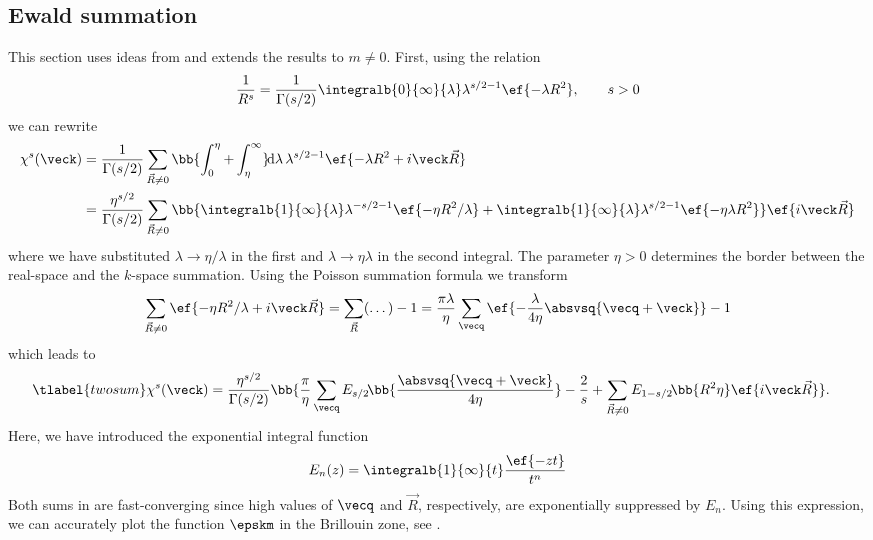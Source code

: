 \subsection{Ewald summation}
This section uses ideas from  and extends the results to $m\ne 0$.
First, using the relation
\begin{align}
    \frac{1}{R^s}=\frac{1}{\Gamma(s/2)} \integralb{0}{\infty}{\lambda} \lambda^{s/2-1} \ef{-\lambda R^2},\qquad s>0
\end{align}
we can rewrite
\begin{align}
    \chi^s(\veck)&=\frac{1}{\Gamma(s/2)}\sum_{\vec{R}\ne 0} \bb{\int_0^\eta + \int_\eta^\infty}\! \mathrm{d}\lambda\, \lambda^{s/2-1} \ef{-\lambda R^2 + i \veck \vec{R}} \\
                 &= \frac{\eta^{s/2}}{\Gamma(s/2)}\sum_{\vec{R}\ne 0} \bb{\integralb{1}{\infty}{\lambda} \lambda^{-s/2-1} \ef{-\eta R^2 / \lambda} + \integralb{1}{\infty}{\lambda} \lambda^{s/2-1} \ef{-\eta \lambda R^2}} \ef{i\veck \vec{R}}
\end{align}
where we have substituted $\lambda \rightarrow \eta/\lambda$ in the first and $\lambda \rightarrow \eta \lambda$ in the second integral.
The parameter $\eta > 0$ determines the border between the real-space and the $k$-space summation.
Using the Poisson summation formula we transform
\begin{align}
    \sum_{\vec{R}\ne 0} \ef{-\eta R^2/\lambda + i \veck \vec{R}} = \sum_{\vec{R}} (\dots) - 1 = \frac{\pi\lambda}{\eta} \sum_{\vecq} \ef{-\frac{\lambda}{4\eta} \absvsq{\vecq+\veck}} - 1
\end{align}
which leads to
\begin{align} \tlabel{twosum}
    \chi^s(\veck) &= \frac{\eta^{s/2}}{\Gamma(s/2)} \bb{\frac{\pi}{\eta} \sum_{\vecq} E_{s/2}\!\bb{\frac{\absvsq{\vecq+\veck}}{4\eta}} - \frac{2}{s} + \sum_{\vec{R}\ne 0} E_{1-s/2}\!\bb{R^2 \eta} \ef{i \veck \vec{R}} }.
\end{align}
Here, we have introduced the exponential integral function
\begin{align}
    E_n(z) = \integralb{1}{\infty}{t} \frac{\ef{-z t}}{t^n}
\end{align}
Both sums in  are fast-converging since high
values of $\vecq$ and $\vec{R}$, respectively, are exponentially suppressed by $E_n$.
Using this expression, we can accurately plot the function $\epskm$ in the Brillouin zone, see .

